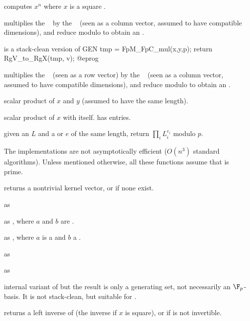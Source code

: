  computes $x^n$ where $x$ is a
square .

 multiplies the ~
by the ~ (seen as a column vector, assumed to have compatible
dimensions), and reduce modulo  to obtain an .

 is a stack-clean
version of
\bprog
  GEN tmp = FpM_FpC_mul(x,y,p);
  return RgV_to_RgX(tmp, v);
@eprog

 multiplies the ~
(seen as a row vector) by the ~ (seen as a column vector,
assumed to have compatible dimensions), and reduce modulo  to obtain
an .

 scalar product of
$x$ and $y$ (assumed to have the same length).

 scalar product of $x$ with itself.
has  entries.

 given an  $L$
and a  or  $e$ of the same length, return $\prod_i L_i^{e_i}$
modulo $p$.

 The implementations are not
asymptotically efficient ($O(n^3)$ standard algorithms). Unless mentioned
otherwise, all these functions assume that  is prime.

 returns a nontrivial kernel vector,
or  if none exist.

 as 

 as , where $a$ and
$b$ are .

 as , where $a$
is a  and $b$ a .

 as 

 as 

 internal variant of
 but the result is only a generating set, not
necessarily an $\F_p$-basis. It is not stack-clean, but suitable for
.

 returns a left inverse of 
(the inverse if $x$ is square), or  if  is not invertible.

